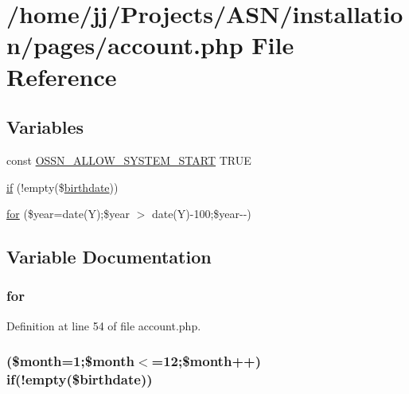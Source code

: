 \hypertarget{pages_2account_8php}{}\section{/home/jj/\+Projects/\+A\+S\+N/installation/pages/account.php File Reference}
\label{pages_2account_8php}
\subsection*{Variables}
\begin{DoxyCompactItemize}
\item 
const \hyperlink{pages_2account_8php_a73aeae1243c8451cb328ddfe84637175}{O\+S\+S\+N\+\_\+\+A\+L\+L\+O\+W\+\_\+\+S\+Y\+S\+T\+E\+M\+\_\+\+S\+T\+A\+RT} T\+R\+UE
\item 
\hyperlink{pages_2account_8php_ad0ba2276952e201389195e9c2e7ab5be}{if} (!empty(\$\hyperlink{actions_2account_8php_adcebf70992c7074e4bab2e0d5f831536}{birthdate}))
\item 
\hyperlink{pages_2account_8php_aa87738292637f756e24401e77120932b}{for} (\$year=date(\textquotesingle{}Y\textquotesingle{});\$year $>$ date(\textquotesingle{}Y\textquotesingle{})-\/100;\$year-\/-\/)
\end{DoxyCompactItemize}


\subsection{Variable Documentation}
\subsubsection[{\texorpdfstring{for}{for}}]{\setlength{\rightskip}{0pt plus 5cm}for}\hypertarget{pages_2account_8php_aa87738292637f756e24401e77120932b}{}\label{pages_2account_8php_aa87738292637f756e24401e77120932b}


Definition at line 54 of file account.\+php.

\subsubsection[{\texorpdfstring{if}{if}}]{ (\$month=1;\$month$<$=12;\$month++) if(!empty(\${\bf birthdate}))}\hypertarget{pages_2account_8php_ad0ba2276952e201389195e9c2e7ab5be}{}\label{pages_2account_8php_ad0ba2276952e201389195e9c2e7ab5be}



